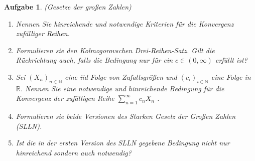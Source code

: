 \documentclass[11pt, a4paper, ngerman]{article}
\newcommand{\N}{\mathbb{N}}
\newcommand{\R}{\mathbb{R}}
\newtheorem{aufgabe}{Aufgabe}
\begin{document}
\begin{aufgabe} (Gesetze der großen Zahlen)
    \begin{enumerate}
        \item 
        Nennen Sie hinreichende und notwendige Kriterien für die Konvergenz zufälliger Reihen. 
        \item
        Formulieren sie den Kolmogorovschen Drei-Reihen-Satz. Gilt die Rückrichtung auch, falls die Bedingung nur für ein $c \in (0, \infty)$ erfüllt ist?
        \item 
        Sei $(X_n)_{n \in \N}$ eine iid Folge von Zufallsgrößen und $(c_i)_{i \in \N}$ eine Folge in $\R$. 
        Nennen Sie eine notwendige und hinreichende Bedingung für die Konvergenz der zufälligen Reihe $\sum_{n=1}^{\infty} c_n X_n$ .  
        \item 
        Formulieren sie beide Versionen des Starken Gesetz der Großen Zahlen (SLLN).
        \item
        Ist die in der ersten Version des SLLN gegebene Bedingung nicht nur hinreichend sondern auch notwendig?
    \end{enumerate} 
\end{aufgabe}
\end{document}
